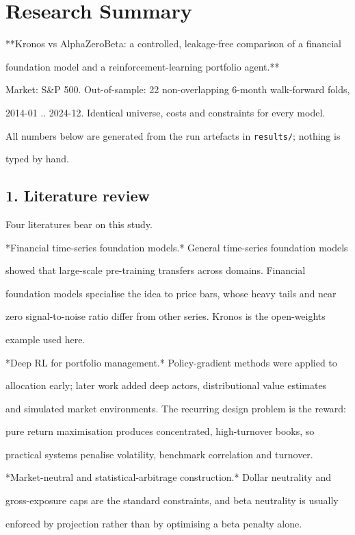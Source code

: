 \section*{Research Summary}

**Kronos vs AlphaZeroBeta: a controlled, leakage-free comparison of a financial\par
foundation model and a reinforcement-learning portfolio agent.**\par

Market: S\&P 500. Out-of-sample: 22 non-overlapping 6-month walk-forward folds,\par
2014-01 .. 2024-12. Identical universe, costs and constraints for every model.\par
All numbers below are generated from the run artefacts in \texttt{results/}; nothing is\par
typed by hand.\par

\subsection*{1. Literature review}

Four literatures bear on this study.\par

*Financial time-series foundation models.* General time-series foundation models\par
showed that large-scale pre-training transfers across domains. Financial\par
foundation models specialise the idea to price bars, whose heavy tails and near\par
zero signal-to-noise ratio differ from other series. Kronos is the open-weights\par
example used here.\par

*Deep RL for portfolio management.* Policy-gradient methods were applied to\par
allocation early; later work added deep actors, distributional value estimates\par
and simulated market environments. The recurring design problem is the reward:\par
pure return maximisation produces concentrated, high-turnover books, so\par
practical systems penalise volatility, benchmark correlation and turnover.\par

*Market-neutral and statistical-arbitrage construction.* Dollar neutrality and\par
gross-exposure caps are the standard constraints, and beta neutrality is usually\par
enforced by projection rather than by optimising a beta penalty alone.\par

